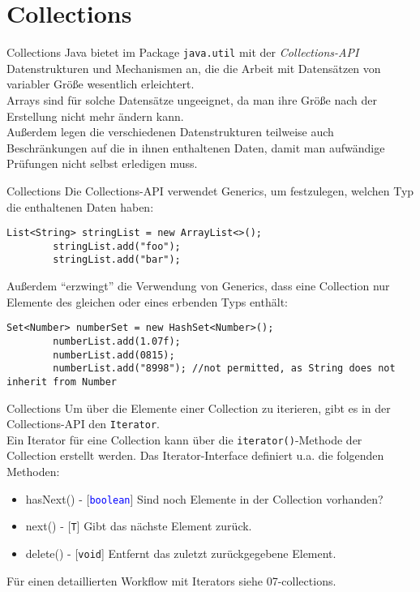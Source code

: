 \section{Collections}
\begin{frame}{Collections}
    \onslide<+->
    Java bietet im Package \texttt{java.util} mit der \textit{Collections-API} Datenstrukturen und Mechanismen an,
    die die Arbeit mit Datensätzen von variabler Größe wesentlich erleichtert.\\
    \onslide<+->
    Arrays sind für solche Datensätze ungeeignet, da man ihre Größe nach der Erstellung nicht mehr ändern kann.\\
    \onslide<+->
    Außerdem legen die verschiedenen Datenstrukturen teilweise auch Beschränkungen auf die in ihnen enthaltenen Daten,
    damit man aufwändige Prüfungen nicht selbst erledigen muss.\\
\end{frame}

\begin{frame}[fragile]{Collections}
    \onslide<+->
    Die Collections-API verwendet Generics, um festzulegen, welchen Typ die enthaltenen Daten haben:
    \begin{lstlisting}[basicstyle=\ttfamily\scriptsize,gobble=8]
        List<String> stringList = new ArrayList<>();
        stringList.add("foo");
        stringList.add("bar");
    \end{lstlisting}
    \onslide<+->
    Außerdem \enquote{erzwingt} die Verwendung von Generics, dass eine Collection nur Elemente des gleichen oder eines erbenden Typs enthält:
    \begin{lstlisting}[basicstyle=\ttfamily\scriptsize,gobble=8]
        Set<Number> numberSet = new HashSet<Number>();
        numberList.add(1.07f);
        numberList.add(0815);
        numberList.add("8998"); //not permitted, as String does not inherit from Number
    \end{lstlisting}
\end{frame}

\begin{frame}[fragile]{Collections}
    \onslide<+->
    Um über die Elemente einer Collection zu iterieren, gibt es in der Collections-API den \texttt{Iterator}.\\
    \onslide<+->
    Ein Iterator für eine Collection kann über die \texttt{iterator()}-Methode der Collection erstellt werden. Das Iterator-Interface definiert u.a. die folgenden Methoden:
    \begin{itemize}[<+->]
        \item hasNext() - [\textcolor{blue}{\texttt{boolean}}] Sind noch Elemente in der Collection vorhanden?
        \item next() - [\texttt{T}] Gibt das nächste Element zurück.
        \item delete() - [\texttt{void}] Entfernt das zuletzt zurückgegebene Element.
    \end{itemize}
    \onslide<+->
    Für einen detaillierten Workflow mit Iterators siehe 07-collections.
\end{frame}

